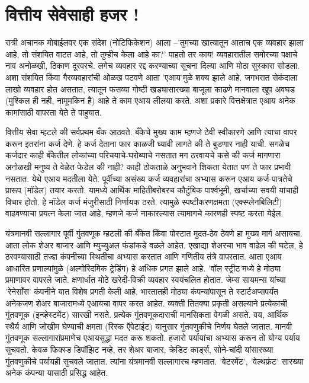 \chapter{वित्तीय सेवेसाही हजर !}

रात्री अचानक मोबाईलवर एक संदेश (नोटिफिकेशन) आला –'तुमच्या खात्यातून आताच एक व्यवहार झाला आहे, तो संशयित वाटत आहे, तो तुम्हीच केला आहे का?' पाहतो तर काय! व्यवहारातील समोरच्या पक्षाचे नाव अनोळखी, ठिकाण दूरवरचे. लगेच व्यवहार रद्द करण्याच्या सूचना दिल्या आणि मोठा सुस्कारा सोडला. अशा संशयित किंवा गैरव्यवहारांची ओळख पटवणे आता 'एआय'मुळे शक्य झाले आहे. जगभरात सेकंदाला लाखो व्यवहार होत असतात, त्यातून फसव्या गोष्टी खड्यासारख्या बाजूला काढणे मानवाला खूप अवघड (मुश्किल ही नही, नामूमकिन है) आहे ते काम एआय लीलया करते. अशा प्रकारे वित्तक्षेत्रात एआय अनेक कामांसाठी वापरता येते ते पाहुयात.

वित्तीय सेवा म्हटले की सर्वप्रथम बँक आठवते. बँकेचे मुख्य काम म्हणजे ठेवी स्वीकारणे आणि त्याचा वापर करून इतरांना कर्ज देणे. हे कर्ज देताना फार काळजी घ्यावी लागते की ते बुडणार नाही याची. सगळेच कर्जदार काही बँकेतील लोकांच्या परिचयाचे-घरोब्याचे नसतात मग ठरवायचे कसे की कर्ज मागणारा अनोळखी मनुष्य ते वेळेत फेडेल की नाही? काही ठोकताळे अनुभवाने शिकता येतात पण ते फार प्रभावी नसतात. येथे एआय मदतीला येते. पूर्वीच्या असंख्य कर्ज व्यवहारांचा अभ्यास करून एआय कर्ज-पात्रतेचे प्रारूप (मॉडेल) तयार करतो. यामध्ये आर्थिक माहितीबरोबरच कौटुंबिक पार्श्वभूमी, खर्चाच्या सवयी यांचाही विचार होतो. हे मॉडेल कर्ज मंजुरीसाठी निर्णायक ठरते. त्यामुळे स्पष्टीकरणक्षमता (एक्स्प्लेनबिलिटी) वाढवण्याचा प्रयत्न केला जात आहे, म्हणजे कर्ज नाकारल्यास त्यामागचे कारणही स्पष्ट करता येईल.

यंत्रमानवी सल्लागार
पूर्वी गुंतवणूक म्हटली की बँकेत किंवा पोस्टात मुदत-ठेव ठेवणे हा मुख्य मार्ग असायचा. आता लोक शेअर बाजार आणि म्युच्युअल फंडांकडे वळले आहेत. एखाद्या शेअरचा भाव वाढेल की घटेल, हे ठरवण्यासाठी तज्ज्ञ कंपनीच्या स्थितीचा अभ्यास करतात आणि गणितीय तंत्रे वापरतात. आता एआय आधारित प्रणाल्यांमुळे (अल्गोरिदमिक ट्रेडिंग) हे अधिक प्रगत झाले आहे. 'वॉल स्ट्रीट'मध्ये हे मोठ्या प्रमाणावर वापरले जाते. क्षणार्धात मोठे खरेदी-विक्री व्यवहार स्वयंचलित होतात. जेम्स सायमन्स यांच्या 'रेनेसाँस' कंपनीने यात विशेष प्रगती केली आहे. भारतातही मोठ्या कंपन्यांपासून ते स्टार्टअप्सपर्यंत अनेकजण शेअर बाजारामध्ये एआयचा वापर करत आहेत. व्यक्ती तितक्या प्रकृती असल्याने प्रत्येकाची गुंतवणूक (इन्व्हेस्टमेंट) सारखी नसते. प्रत्येक गुंतवणूकदाराची मानसिकता वेगळी असते. वय, आर्थिक स्थैर्य आणि जोखीम घेण्याची क्षमता (रिस्क ऍपेटाईट) यानुसार गुंतवणुकीचे निर्णय घेतले जातात. मानवी गुंतवणूक सल्लागारांप्रमाणेच एआयसुद्धा मदत करू शकतो. हजारो पर्यायांचा अभ्यास करून तो योग्य पर्याय सुचवतो. केवळ फिक्स्ड डिपॉझिट नव्हे, तर शेअर बाजार, क्रेडिट कार्ड्स, सोने-चांदी यांसारख्या गुंतवणुकीचे पर्यायही सुचवले जातात. त्यांना यंत्रमानवी सल्लागारच म्हणतात. 'बेटरमेंट', 'वेल्थफ्रंट' सारख्या अनेक कंपन्या यासाठी प्रसिद्ध आहेत.

